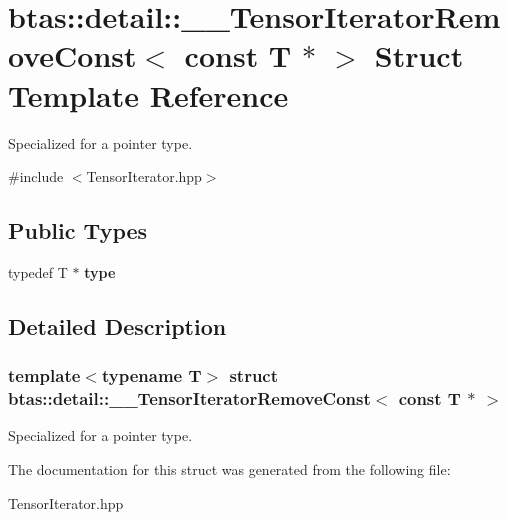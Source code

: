 \hypertarget{structbtas_1_1detail_1_1_____tensor_iterator_remove_const_3_01const_01_t_01_5_01_4}{
\section{btas::detail::\_\-\_\-TensorIteratorRemoveConst$<$ const T $\ast$ $>$ Struct Template Reference}
\label{structbtas_1_1detail_1_1_____tensor_iterator_remove_const_3_01const_01_t_01_5_01_4}
}


Specialized for a pointer type.  


{\ttfamily \#include $<$TensorIterator.hpp$>$}\subsection*{Public Types}
\begin{DoxyCompactItemize}
\item 
\hypertarget{structbtas_1_1detail_1_1_____tensor_iterator_remove_const_3_01const_01_t_01_5_01_4_ae7d73b03e295d8d902b6ba0fe116c5cf}{
typedef T $\ast$ {\bfseries type}}
\label{structbtas_1_1detail_1_1_____tensor_iterator_remove_const_3_01const_01_t_01_5_01_4_ae7d73b03e295d8d902b6ba0fe116c5cf}

\end{DoxyCompactItemize}


\subsection{Detailed Description}
\subsubsection*{template$<$typename T$>$ struct btas::detail::\_\-\_\-TensorIteratorRemoveConst$<$ const T $\ast$ $>$}

Specialized for a pointer type. 

The documentation for this struct was generated from the following file:\begin{DoxyCompactItemize}
\item 
TensorIterator.hpp\end{DoxyCompactItemize}
